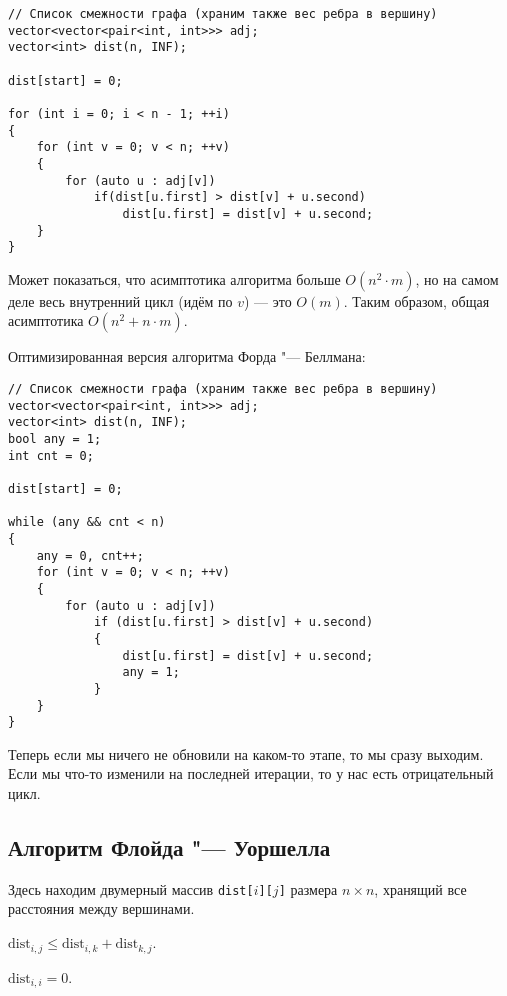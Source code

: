 \begin{verbatim}
// Список смежности графа (храним также вес ребра в вершину)
vector<vector<pair<int, int>>> adj;
vector<int> dist(n, INF);

dist[start] = 0;

for (int i = 0; i < n - 1; ++i)
{
    for (int v = 0; v < n; ++v)
    {
        for (auto u : adj[v])
            if(dist[u.first] > dist[v] + u.second)
                dist[u.first] = dist[v] + u.second;
    }
}
\end{verbatim}

Может показаться, что асимптотика алгоритма больше $O(n^2 \cdot m)$, но на самом деле весь внутренний цикл (идём по $v$) --- это $O(m)$. Таким образом, общая асимптотика $O(n^2 + n \cdot m)$.

Оптимизированная версия алгоритма Форда "--- Беллмана:

\begin{verbatim}
// Список смежности графа (храним также вес ребра в вершину)
vector<vector<pair<int, int>>> adj;
vector<int> dist(n, INF);
bool any = 1;
int cnt = 0;

dist[start] = 0;

while (any && cnt < n)
{
    any = 0, cnt++;
    for (int v = 0; v < n; ++v)
    {
        for (auto u : adj[v])
            if (dist[u.first] > dist[v] + u.second)
            {
                dist[u.first] = dist[v] + u.second;
                any = 1;
            }
    }
}
\end{verbatim}

Теперь если мы ничего не обновили на каком-то этапе, то мы сразу выходим. Если мы что-то изменили на последней итерации, то у нас есть отрицательный цикл.

\subsection{Алгоритм Флойда "--- Уоршелла}

Здесь находим двумерный массив \texttt{dist[$i$][$j$]} размера $n \times n$, хранящий все расстояния между вершинами.

\begin{lemma}
    $\mathrm{dist}_{i, j} \leqslant \mathrm{dist}_{i, k} + \mathrm{dist}_{k, j}$.
\end{lemma}

\begin{lemma}
    $\mathrm{dist}_{i, i} = 0$.
\end{lemma}

